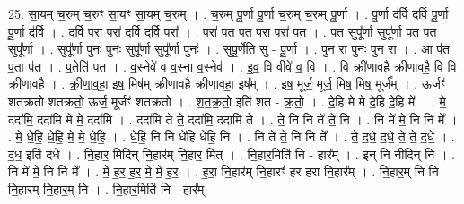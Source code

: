 \documentclass[17pt]{extarticle}
\begin{document}
25. सा॒यम् च॒रुम् च॒रुꣳ सा॒यꣳ सा॒यम् च॒रुम् । . च॒रुम् पू॒र्णा पू॒र्णा च॒रुम् च॒रुम् पू॒र्णा । . पू॒र्णा द॑र्वि दर्वि पू॒र्णा पू॒र्णा द॑र्वि । . द॒र्वि॒ परा॒ परा॑ दर्वि दर्वि॒ परा᳚ । . परा॑ पत पत॒ परा॒ परा॑ पत । . प॒त॒ सुपू᳚र्णा॒ सुपू᳚र्णा पत पत॒ सुपू᳚र्णा । . सुपू᳚र्णा॒ पुनः॒ पुनः॒ सुपू᳚र्णा॒ सुपू᳚र्णा॒ पुनः॑ । . सुपू॒र्णेति॒ सु - पू॒र्णा॒ । . पुन॒ रा पुनः॒ पुन॒ रा । . आ प॑त प॒ता प॑त । . प॒तेति॑ पत । . व॒स्नेवे॑ व व॒स्ना व॒स्नेव॑ । . इ॒व॒ वि वीवे॑ व॒ वि । . वि क्री॑णावहै क्रीणावहै॒ वि वि क्री॑णावहै । . क्री॒णा॒व॒हा॒ इष॒ मिष॑म् क्रीणावहै क्रीणावहा॒ इष᳚म् । . इष॒ मूर्ज॒ मूर्ज॒ मिष॒ मिष॒ मूर्ज᳚म् । . ऊर्जꣳ॑ शतक्रतो शतक्रतो॒ ऊर्ज॒ मूर्जꣳ॑ शतक्रतो । . श॒त॒क्र॒तो॒ इति॑ शत - क्र॒तो॒ । . दे॒हि मे॑ मे दे॒हि दे॒हि मे᳚ । . मे॒ ददा॑मि॒ ददा॑मि मे मे॒ ददा॑मि । . ददा॑मि ते ते॒ ददा॑मि॒ ददा॑मि ते । . ते॒ नि नि ते॑ ते॒ नि । . नि मे॑ मे॒ नि नि मे᳚ । . मे॒ धे॒हि॒ धे॒हि॒ मे॒ मे॒ धे॒हि॒ । . धे॒हि॒ नि नि धे॑हि धेहि॒ नि । . नि ते॑ ते॒ नि नि ते᳚ । . ते॒ द॒धे॒ द॒धे॒ ते॒ ते॒ द॒धे॒ । . द॒ध॒ इति॑ दधे । . नि॒हार॒ मिदिन् नि॒हार॑म् नि॒हार॒ मित् । . नि॒हार॒मिति॑ नि - हार᳚म् । . इन् नि नीदिन् नि । . नि मे॑ मे॒ नि नि मे᳚ । . मे॒ ह॒र॒ ह॒र॒ मे॒ मे॒ ह॒र॒ । . ह॒रा॒ नि॒हार॑म् नि॒हारꣳ॑ हर हरा नि॒हार᳚म् । . नि॒हार॒म् नि नि नि॒हार॑म् नि॒हार॒म् नि । . नि॒हार॒मिति॑ नि - हार᳚म् । \newline
\end{document}
